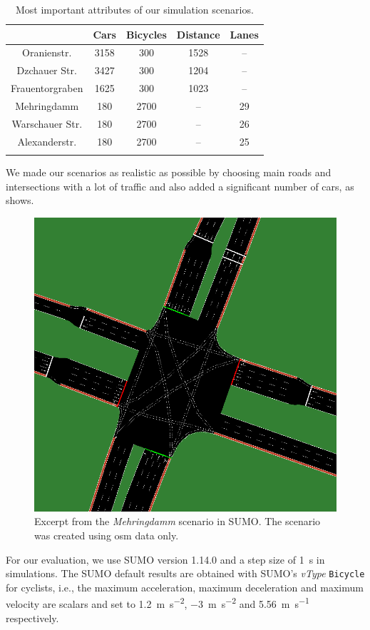 \begin{table}%
\centering
\caption{Most important attributes of our simulation scenarios.}%
\label{tab:scenarios}
\begin{tabular}{ccccc}%
\toprule%
                & Cars  & Bicycles & Distance & Lanes\\%
\midrule%
\midrule%
Oranienstr.     & \num{3158} & \num{300}      & \num{1528}    & --\\%
Dzchauer Str.   & \num{3427} & \num{300}      & \num{1204}    & --\\%
Frauentorgraben & \num{1625} & \num{300}      & \num{1023}    & --\\%
Mehringdamm     & \num{180}   & \num{2700}    & --       & \num{29}\\%
Warschauer Str. & \num{180}   & \num{2700}    & --       & \num{26}\\%
Alexanderstr.   & \num{180}   & \num{2700}    & --       & \num{25}\\%
\bottomrule&%
\end{tabular}%
\end{table}

We made our scenarios as realistic as possible by choosing main roads and intersections with a lot of traffic and also added a significant number of cars, as  shows.
\begin{figure}
    \centering
    \includegraphics[width=0.5\columnwidth]{fig/mehringdamm_screenshot.png}
    \caption{%
        Excerpt from the \textit{Mehringdamm} scenario in SUMO.
        The scenario was created using \ac{osm} data only.
    }%
    \label{fig:mehringdamm_sumo}
\end{figure}

For our evaluation, we use SUMO version 1.14.0 and a step size of \SI{1}{\s} in simulations.
The SUMO default results are obtained with SUMO's \textit{vType} \texttt{Bicycle} for cyclists, i.e., the maximum acceleration, maximum deceleration and maximum velocity are scalars and set to \SI{1.2}{\m\per\s\squared}, \SI{-3}{\m\per\s\squared} and \SI{5.56}{\m\per\s} respectively.

